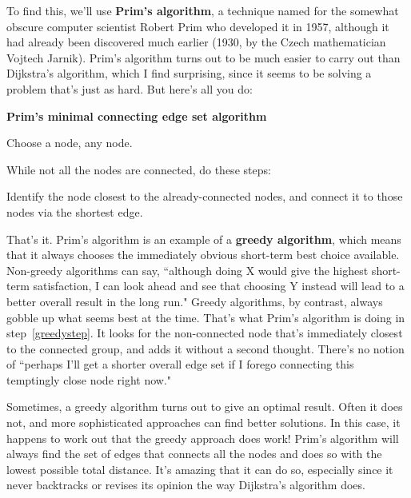 To find this, we'll use \textbf{Prim's algorithm}, a technique named for
the somewhat obscure computer scientist Robert Prim who developed it in
1957, although it had already been discovered much earlier (1930, by the
Czech mathematician Vojtech Jarnik). Prim's algorithm turns out to be much
easier to carry out than Dijkstra's algorithm, which I find surprising,
since it seems to be solving a problem that's just as hard. But here's all
you do:

\vspace{.1in}
\begin{samepage}
\begin{framed}
\textbf{Prim's minimal connecting edge set algorithm}
\begin{compactenum}
\item Choose a node, any node.
\item While not all the nodes are connected, do these steps:
    \begin{compactenum}
    \item \label{greedystep} Identify the node closest to the 
already-connected nodes, and connect it to those nodes via the shortest
edge.
    \end{compactenum}
\end{compactenum}
\end{framed}
\end{samepage}

That's it. Prim's algorithm is an example of a \textbf{greedy algorithm},
which means that it always chooses the immediately obvious short-term best
choice available. Non-greedy algorithms can say, ``although doing X would
give the highest short-term satisfaction, I can look ahead and see that
choosing Y instead will lead to a better overall result in the long run."
Greedy algorithms, by contrast, always gobble up what seems best at the
time. That's what Prim's algorithm is doing in step~\ref{greedystep}. It
looks for the non-connected node that's immediately closest to the
connected group, and adds it without a second thought. There's no notion of
``perhaps I'll get a shorter overall edge set if I forego connecting this
temptingly close node right now."

Sometimes, a greedy algorithm turns out to give an optimal result. Often it
does not, and more sophisticated approaches can find better solutions.  In
this case, it happens to work out that the greedy approach does work!
Prim's algorithm will always find the set of edges that connects all the
nodes and does so with the lowest possible total distance. It's amazing
that it can do so, especially since it never backtracks or revises its
opinion the way Dijkstra's algorithm does.

